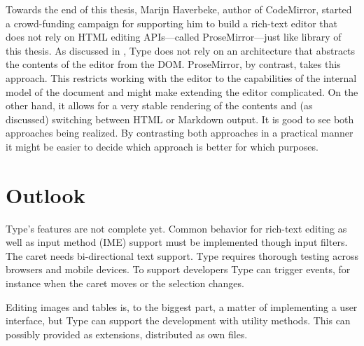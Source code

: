 Towards the end of this thesis, Marijn Haverbeke, author of CodeMirror, started a crowd-funding campaign for supporting him to build a rich-text editor that does not rely on HTML editing APIs---called ProseMirror---just like library of this thesis. As discussed in , Type does not rely on an architecture that abstracts the contents of the editor from the DOM. ProseMirror, by contrast, takes this approach. This restricts working with the editor to the capabilities of the internal model of the document and might make extending the editor complicated. On the other hand, it allows for a very stable rendering of the contents and (as discussed) switching between HTML or Markdown output. It is good to see both approaches being realized. By contrasting both approaches in a practical manner it might be easier to decide which approach is better for which purposes.


\section{Outlook}

Type's features are not complete yet. Common behavior for rich-text editing as well as input method (IME) support must be implemented though input filters. The caret needs bi-directional text support. Type requires thorough testing across browsers and mobile devices. To support developers Type can trigger events, for instance when the caret moves or the selection changes.

Editing images and tables is, to the biggest part, a matter of implementing a user interface, but Type can support the development with utility methods. This can possibly provided as extensions, distributed as own files.





